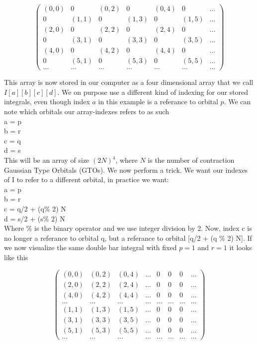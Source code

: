 \documentclass[a4paper,norsk,11pt,twoside]{report}
\begin{document}
\[ \left( \begin{array}{ccccccc}
(0,0) & 0 & (0,2) & 0 & (0,4) & 0 & \dots \\
0 & (1,1) & 0 & (1,3) & 0 & (1,5) & \dots \\
(2,0) & 0 & (2,2) & 0 & (2,4) & 0 & \dots \\
0 & (3,1) & 0 & (3,3) & 0 & (3,5) & \dots \\
(4,0) & 0 & (4,2) & 0 & (4,4) & 0 & \dots \\
0 & (5,1) & 0 & (5,3) & 0 & (5,5) & \dots \\
\dots & \dots & \dots & \dots & \dots & \dots & \dots \end{array} \right)\]

This array is now stored in our computer as a four dimensional array
that we call $I[a][b][c][d]$. We on purpose use a different kind of
indexing for our stored integrals, even though index $a$ in this
example is a referance to orbital $p$. We can note which orbitals our
array-indexes refers to as such\\ a = p \\ b = r \\ c = q \\ d = s \\

This will be an array of size $(2N)^4$, where $N$ is the number of contraction Gaussian Type Orbitals (GTOs). We now perform a trick. We want our indexes of I to refer to a different orbital, in practice we want:\\
a = p\\
b = r\\
c = q/2 + (q\% 2) N\\
d = s/2 + (s\% 2) N\\

Where \% is the binary operator and we use integer division by 2. Now,
index c is no longer a referance to orbital q, but a referance to
orbital [q/2 + (q \% 2) N]. If we now visualize the same double bar
integral with fixed $p=1$ and $r=1$ it looks like this

\[ \left( \begin{array}{cccccccc}
(0,0) & (0,2) & (0,4) & \dots & 0 & 0 & 0 & \dots \\
(2,0) & (2,2) & (2,4) & \dots & 0 & 0 & 0 & \dots\\
(4,0) & (4,2) & (4,4) & \dots & 0 & 0 & 0 & \dots\\
\dots & \dots & \dots & \dots & \dots & \dots & \dots & \dots\\
(1,1) & (1,3) & (1,5) & \dots & 0 & 0 & 0 & \dots\\
(3,1) & (3,3) & (3,5) & \dots & 0 & 0 & 0 & \dots\\
(5,1) & (5,3) & (5,5) & \dots & 0 & 0 & 0 & \dots\\
\dots & \dots & \dots & \dots & \dots & \dots & \dots & \dots \end{array} \right)\]
\end{document}
